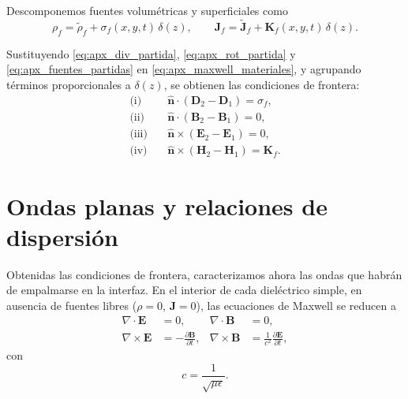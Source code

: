 Descomponemos fuentes volumétricas y superficiales como
\begin{equation}
\rho_f = \tilde\rho_f + \sigma_f(x,y,t)\,\delta(z),
\qquad
\mathbf J_f = \tilde{\mathbf J}_f + \mathbf K_f(x,y,t)\,\delta(z).
\label{eq:apx_fuentes_partidas}
\end{equation}

Sustituyendo \eqref{eq:apx_div_partida}, \eqref{eq:apx_rot_partida} y \eqref{eq:apx_fuentes_partidas} en \eqref{eq:apx_maxwell_materiales}, y agrupando términos proporcionales a $\delta(z)$, se obtienen las condiciones de frontera:
\begin{equation}
\begin{aligned}
\text{(i)}\quad &\hat{\mathbf n}\cdot(\mathbf D_2-\mathbf D_1) = \sigma_f,\\
\text{(ii)}\quad &\hat{\mathbf n}\cdot(\mathbf B_2-\mathbf B_1) = 0,\\
\text{(iii)}\quad &\hat{\mathbf n}\times(\mathbf E_2-\mathbf E_1) = 0,\\
\text{(iv)}\quad &\hat{\mathbf n}\times(\mathbf H_2-\mathbf H_1) = \mathbf K_f.
\end{aligned}
\label{eq:apx_condiciones_frontera_finales}
\end{equation}

\section{Ondas planas y relaciones de dispersión}
\label{subsec:apx_ondas_planas}

Obtenidas las condiciones de frontera, caracterizamos ahora las ondas que habrán de empalmarse en la interfaz. En el interior de cada dieléctrico simple, en ausencia de fuentes libres ($\rho=0$, $\mathbf J=0$), las ecuaciones de Maxwell se reducen a
\begin{equation}
\begin{aligned}
\nabla \cdot \mathbf E &= 0, & \nabla \cdot \mathbf B &= 0,\\
\nabla \times \mathbf E &= -\frac{\partial \mathbf B}{\partial t},
& \nabla \times \mathbf B &= \frac{1}{c^2}\frac{\partial \mathbf E}{\partial t},
\end{aligned}
\label{eq:apx_maxwell_vacio_local}
\end{equation}
con
\begin{equation}
c = \frac{1}{\sqrt{\mu\epsilon}}.
\label{eq:apx_c_medio}
\end{equation}


